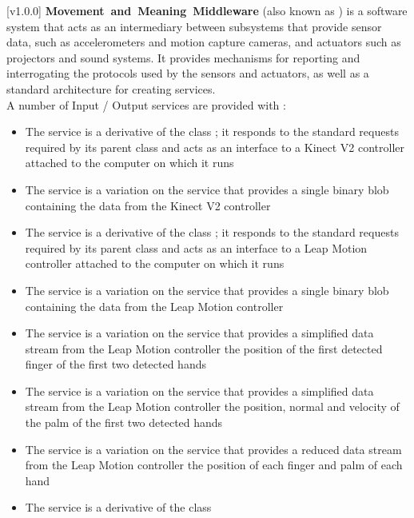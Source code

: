 [v1.0.0]
\textbf{Movement~and~Meaning~Middleware} (also known as \mplusm{}) is a software system
that acts as an intermediary between subsystems that provide sensor data, such as
accelerometers and motion capture cameras, and actuators such as projectors and sound
systems.
It provides mechanisms for reporting and interrogating the protocols used by the sensors
and actuators, as well as a standard architecture for creating services.\\

A number of Input / Output services are provided with \mplusm:
\begin{itemize}
\item The \textbf{\KVtwoI} service is a derivative of the \mplusm{} class
;
it responds to the standard requests required by its parent class and acts as an interface
to a Kinect V2 controller attached to the computer on which it runs
\item\exSp{}The \textbf{\KVtwoBI} service is a variation on the \KVtwoI{} service that
provides a single binary blob containing the data from the Kinect V2 controller
\item\exSp{}The \textbf{\LMI} service is a derivative of the \mplusm{} class
;
it responds to the standard requests required by its parent class and acts as an interface
to a Leap Motion controller attached to the computer on which it runs
\item\exSp{}The \textbf{\LBI} service is a variation on the \LMI{} service that provides a
single binary blob containing the data from the Leap Motion controller
\item\exSp{}The \textbf{\LTFI} service is a variation on the \LMI{} service that provides
a simplified data stream from the Leap Motion controller \longDash{} the position of the
first detected finger of the first two detected hands
\item\exSp{}The \textbf{\LTPI} service is a variation on the \LMI{} service that provides
a simplified data stream from the Leap Motion controller \longDash{} the position, normal
and velocity of the palm of the first two detected hands
\item\exSp{}The \textbf{\LFI} service is a variation on the \LMI{} service that provides
a reduced data stream from the Leap Motion controller \longDash{} the position of each
finger and palm of each hand
\item\exSp{}The \textbf{\LDO} service is a derivative of the \mplusm{} class

\end{itemize}
